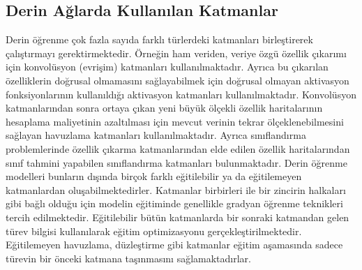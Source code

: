 \subsection{Derin Ağlarda Kullanılan Katmanlar}
Derin öğrenme çok fazla sayıda farklı türlerdeki katmanları birleştirerek çalıştırmayı gerektirmektedir. Örneğin ham veriden, veriye özgü özellik çıkarımı için konvolüsyon (evrişim) katmanları kullanılmaktadır. Ayrıca bu çıkarılan özelliklerin doğrusal olmamasını sağlayabilmek için doğrusal olmayan aktivasyon fonksiyonlarının kullanıldığı aktivasyon katmanları kullanılmaktadır. Konvolüsyon katmanlarından sonra ortaya çıkan yeni büyük ölçekli özellik haritalarının hesaplama maliyetinin azaltılması için mevcut verinin tekrar ölçeklenebilmesini sağlayan havuzlama katmanları kullanılmaktadır. Ayrıca sınıflandırma problemlerinde özellik çıkarma katmanlarından elde edilen özellik haritalarından sınıf tahmini yapabilen sınıflandırma katmanları bulunmaktadır. Derin öğrenme modelleri bunların dışında birçok farklı eğitilebilir ya da eğitilemeyen katmanlardan oluşabilmektedirler. Katmanlar birbirleri ile bir zincirin halkaları gibi bağlı olduğu için modelin eğitiminde genellikle gradyan öğrenme teknikleri tercih edilmektedir. Eğitilebilir bütün katmanlarda bir sonraki katmandan gelen türev bilgisi kullanılarak eğitim optimizasyonu gerçekleştirilmektedir. Eğitilemeyen havuzlama, düzleştirme gibi katmanlar eğitim aşamasında sadece türevin bir önceki katmana taşınmasını sağlamaktadırlar.


